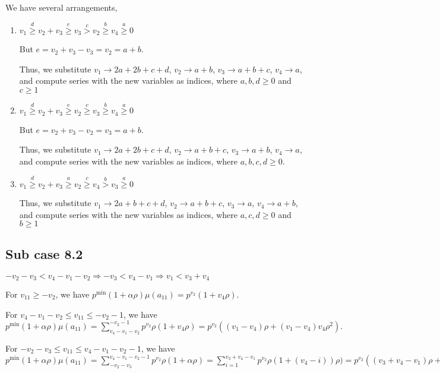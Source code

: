 \documentclass{article}
\begin{document}
We have several arrangements,
\begin{enumerate}
    \item 
$v_1\overset{d}{\geq}v_2+v_3\overset{e}{\geq}v_3\overset{c}{>}{v_2}\overset{b}{\geq}v_4\overset{a}{\geq}{0}$

But $e=v_2+v_3-v_3=v_2=a+b.$

Thus, we substitute 
$v_1\rightarrow{2a+2b+c+d}$, 
$v_2\rightarrow{a+b}$, 
$v_3\rightarrow{a+b+c}$, 
$v_4\rightarrow{a}$, and compute series with the new variables as indices, where $a,b,d\geq{0}$ and $c\geq{1}$  
    \item 
$v_1\overset{d}{\geq}v_2+v_3\overset{e}{\geq}v_2\overset{c}{\geq}{v_3}\overset{b}{\geq}v_4\overset{a}{\geq}{0}$

But $e=v_2+v_3-v_2=v_3=a+b.$

Thus, we substitute 
$v_1\rightarrow{2a+2b+c+d}$, 
$v_2\rightarrow{a+b+c}$, 
$v_3\rightarrow{a+b}$, 
$v_4\rightarrow{a}$, and compute series with the new variables as indices, where $a,b,c,d\geq{0}.$

    \item 
$v_1\overset{d}{\geq}v_2+v_3\overset{a}{\geq}v_2\overset{c}{\geq}{v_4}\overset{b}{>}v_3\overset{a}{\geq}{0}$

Thus, we substitute 
$v_1\rightarrow{2a+b+c+d}$, 
$v_2\rightarrow{a+b+c}$, 
$v_3\rightarrow{a}$, 
$v_4\rightarrow{a+b}$, and compute series with the new variables as indices, where $a,c,d\geq{0}$ and $b\geq{1}$
\end{enumerate}

\subsection{Sub case 8.2}

$-v_2-v_3<{v_4-v_1-v_2}\Rightarrow{-v_3<{v_4-v_1}}\Rightarrow{v_1<{v_3+v_4}}$

For $v_{11}\geq{-v_2}$, we have $p^{\min}(1+\alpha\rho)\mu(a_{11})=p^{v_2}(1+v_4\rho).$

For $v_4-v_1-v_2\leq{v_{11}}\leq{-v_2-1}$, we have $p^{\min}(1+\alpha\rho)\mu(a_{11})=\sum_{v_4-v_1-v_2}^{-v_2-1}p^{v_2}\rho(1+v_4\rho)=p^{v_2}((v_1-v_4)\rho+(v_1-v_4)v_4\rho^2).$

For $-v_2-v_3\leq{v_{11}}\leq{v_4-v_1-v_2-1}$, we have $p^{\min}(1+\alpha\rho)\mu(a_{11})=\sum_{-v_2-v_3}^{v_4-v_1-v_2-1}p^{v_2}\rho(1+\alpha\rho)=\sum_{i=1}^{v_3+v_4-v_1}p^{v_2}\rho(1+(v_4-i))\rho)=p^{v_2}((v_3+v_4-v_1)\rho+(v_3+v_4-v_1)v_4\rho^2-\binom{v_3+v_4-v_1+1}{2}\rho^2).$
\end{document}
